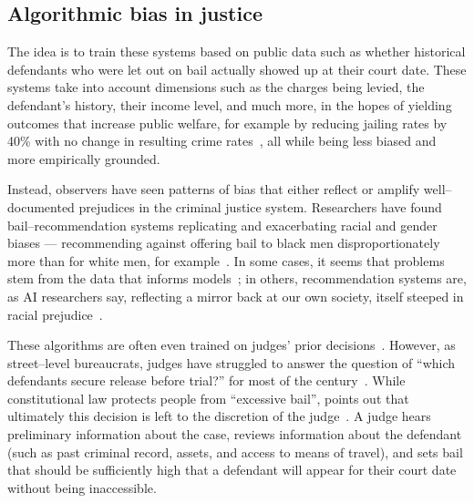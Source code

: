 \documentclass[main]{subfiles}
\begin{document}
\subsection{Algorithmic bias in justice}

The idea is to train these systems based on
public data such as whether historical defendants who were let out on bail
actually showed up at their court date.
These systems take into account dimensions such as
the charges being levied,
the defendant's history,
their income level, and
much more, in the hopes of yielding outcomes that increase public welfare,
for example by reducing jailing rates by 40\% with no change in resulting crime rates~\cite{kleinberg2017human},
all while being less biased and more empirically grounded.

Instead, observers have seen patterns of bias that
either reflect or amplify
well--documented prejudices in the criminal justice system.
Researchers have found bail--recommendation systems replicating and exacerbating
racial and gender biases
--- recommending against offering bail to black men disproportionately more than for white men, for example~\cite{propublica}.
In some cases,
it seems that problems stem from the data that informs models~\cite{buolamwini2018gender};
in others, recommendation systems are,
as AI researchers say,
reflecting a mirror back at our own society,
itself steeped in racial prejudice~\cite{lambrecht2018algorithmic,thebault2015avoiding}.

These algorithms are often even trained on judges' prior decisions~\cite{kleinberg2017human}.
However, as street--level bureaucrats, judges have struggled to answer the question of
``which defendants secure release before trial?'' for most of the  century~\cite{walker1993taming}.
While constitutional law protects people from ``excessive bail'',
\citeauthor{walker1993taming} points out that ultimately
this decision is left to the discretion of the judge~\cite{walker1993taming}.
A judge hears preliminary information about the case,
reviews information about the defendant
(such as past criminal record, assets, and access to means of travel), and
sets bail that should be sufficiently high that a defendant will appear for their court date without being inaccessible.
\end{document}
